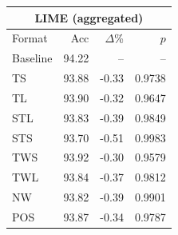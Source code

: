 \begin{tabular}{lrrr}
\toprule
\multicolumn{4}{c}{\textbf{LIME (aggregated)}} \\
\midrule
Format & Acc & $\Delta$\% & $p$ \\
\midrule
Baseline & 94.22 & -- & -- \\
\midrule
TS & 93.88 & -0.33 & 0.9738 \\
TL & 93.90 & -0.32 & 0.9647 \\
STL & 93.83 & -0.39 & 0.9849 \\
STS & 93.70 & -0.51 & 0.9983 \\
TWS & 93.92 & -0.30 & 0.9579 \\
TWL & 93.84 & -0.37 & 0.9812 \\
NW & 93.82 & -0.39 & 0.9901 \\
POS & 93.87 & -0.34 & 0.9787 \\
\bottomrule
\end{tabular}